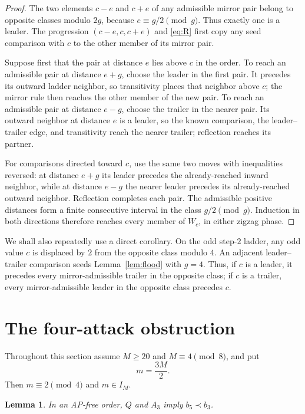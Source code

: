 \documentclass[11pt]{article}
\newtheorem{lemma}[theorem]{Lemma}
\newcommand{\IM}{I_M}
\begin{document}
\begin{proof}
The two elements $c-e$ and $c+e$ of any admissible mirror pair belong to
opposite classes modulo $2g$, because $e\equiv g/2\pmod g$.  Thus exactly one
is a leader.  The progression $(c-e,c,c+e)$ and \eqref{eq:R} first copy any
seed comparison with $c$ to the other member of its mirror pair.

Suppose first that the pair at distance $e$ lies above $c$ in the order.  To
reach an admissible pair at distance $e+g$, choose the leader in the first
pair.  It precedes its outward ladder neighbor, so transitivity places that
neighbor above $c$; the mirror rule then reaches the other member of the new
pair.  To reach an admissible pair at distance $e-g$, choose the trailer in
the nearer pair.  Its outward neighbor at distance $e$ is a leader, so the
known comparison, the leader--trailer edge, and transitivity reach the nearer
trailer; reflection reaches its partner.

For comparisons directed toward $c$, use the same two moves with inequalities
reversed: at distance $e+g$ its leader precedes the already-reached inward
neighbor, while at distance $e-g$ the nearer leader precedes its
already-reached outward neighbor.  Reflection completes each pair.  The
admissible positive distances form a finite consecutive interval in the
class $g/2\pmod g$.  Induction in both directions therefore reaches every
member of $W_c$, in either zigzag phase.
\end{proof}

We shall also repeatedly use a direct corollary.  On the odd step-$2$ ladder,
any odd value $c$ is displaced by $2$ from the opposite class modulo $4$.
An adjacent leader--trailer comparison seeds Lemma~\ref{lem:flood} with
$g=4$.  Thus, if $c$ is a leader, it precedes every mirror-admissible trailer
in the opposite class; if $c$ is a trailer, every mirror-admissible leader in
the opposite class precedes $c$.

\section{The four-attack obstruction}\label{sec:proof}

Throughout this section assume $M\geq20$ and $M\equiv4\pmod8$, and put
\[
  m=\frac{3M}{2}.
\]
Then $m\equiv2\pmod4$ and $m\in\IM$.

\begin{lemma}\label{lem:phase}
In an AP-free order, $Q$ and $A_3$ imply $b_5\prec b_3$.
\end{lemma}
\end{document}
